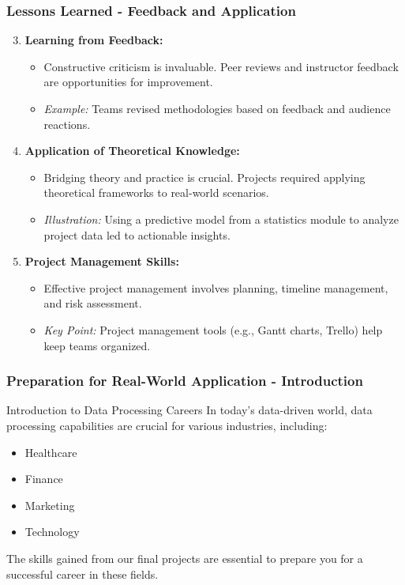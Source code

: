 \documentclass[aspectratio=169]{beamer}
\begin{document}
\begin{frame}[fragile]
  \frametitle{Lessons Learned - Feedback and Application}
  \begin{enumerate}
    \setcounter{enumi}{2}
    \item \textbf{Learning from Feedback:} 
      \begin{itemize}
        \item Constructive criticism is invaluable. Peer reviews and instructor feedback are opportunities for improvement.
        \item \textit{Example:} Teams revised methodologies based on feedback and audience reactions.
      \end{itemize}

    \item \textbf{Application of Theoretical Knowledge:} 
      \begin{itemize}
        \item Bridging theory and practice is crucial. Projects required applying theoretical frameworks to real-world scenarios.
        \item \textit{Illustration:} Using a predictive model from a statistics module to analyze project data led to actionable insights.
      \end{itemize}

    \item \textbf{Project Management Skills:} 
      \begin{itemize}
        \item Effective project management involves planning, timeline management, and risk assessment.
        \item \textit{Key Point:} Project management tools (e.g., Gantt charts, Trello) help keep teams organized.
      \end{itemize}
  \end{enumerate}
\end{frame}

\begin{frame}[fragile]
    \frametitle{Preparation for Real-World Application - Introduction}
    \begin{block}{Introduction to Data Processing Careers}
        In today's data-driven world, data processing capabilities are crucial for various industries, including:
        \begin{itemize}
            \item Healthcare
            \item Finance
            \item Marketing
            \item Technology
        \end{itemize}
        The skills gained from our final projects are essential to prepare you for a successful career in these fields.
    \end{block}
\end{frame}
\end{document}
